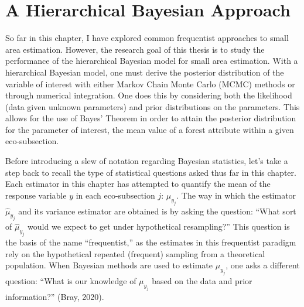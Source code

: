 \documentclass[12pt,twoside]{reedthesis}
\begin{document}
\hypertarget{a-hierarchical-bayesian-approach}{%
\section{A Hierarchical Bayesian Approach}\label{a-hierarchical-bayesian-approach}}

So far in this chapter, I have explored common frequentist approaches to small area estimation. However, the research goal of this thesis is to study the performance of the hierarchical Bayesian model for small area estimation. With a hierarchical Bayesian model, one must derive the posterior distribution of the variable of interest with either Markov Chain Monte Carlo (MCMC) methods or through numerical integration. One does this by considering both the likelihood (data given unknown parameters) and prior distributions on the parameters. This allows for the use of Bayes' Theorem in order to attain the posterior distribution for the parameter of interest, the mean value of a forest attribute within a given eco-subsection.

Before introducing a slew of notation regarding Bayesian statistics, let's take a step back to recall the type of statistical questions asked thus far in this chapter. Each estimator in this chapter has attempted to quantify the mean of the response variable \(y\) in each eco-subsection \(j\): \(\mu_{y_j}\). The way in which the estimator \(\hat\mu_{y_j}\) and its variance estimator are obtained is by asking the question: ``What sort of \(\hat\mu_{y_j}\) would we expect to get under hypothetical resampling?'' This question is the basis of the name ``frequentist,'' as the estimates in this frequentist paradigm rely on the hypothetical repeated (frequent) sampling from a theoretical population. When Bayesian methods are used to estimate \(\mu_{y_j}\), one asks a different question: ``What is our knowledge of \(\mu_{y_j}\) based on the data and prior information?'' (Bray, 2020).
\end{document}
